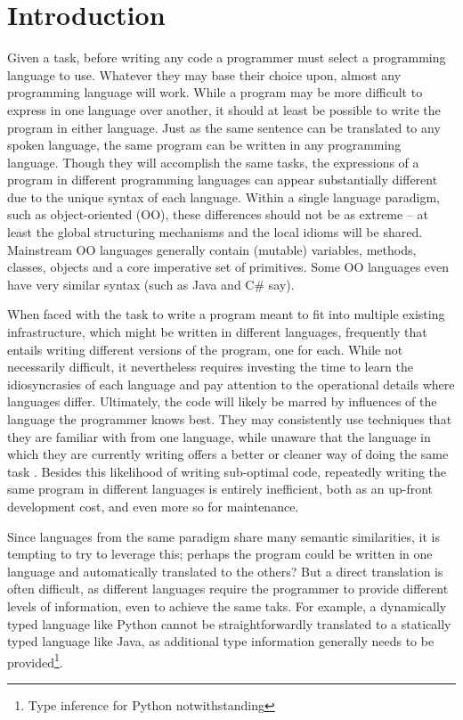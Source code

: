 \documentclass[sigplan,review,anonymous,prologue,dvipsnames]{acmart}
\begin{document}
\section{Introduction}

Given a task, before writing any code a programmer must select a programming 
language to use. Whatever they may base their choice upon, almost any
programming language will work. While a program may be more difficult to
express in one language over another, it should at least be possible to write
the program in either language. Just as the same sentence can be translated to
any spoken language, the same program can be written in any programming
language. Though they will accomplish the same tasks, the
expressions of a program in different programming languages can appear
substantially different due to the unique syntax of each language. Within a
single language paradigm, such as object-oriented (OO),
these differences should not be as extreme -- at least the global structuring
mechanisms and the local idioms will be shared.  Mainstream OO languages
generally contain (mutable) variables, methods, classes, objects and a core
imperative set of primitives. Some OO languages even have very similar syntax
(such as Java and C\# say).

When faced with the task to write a program meant to fit into multiple existing
infrastructure, which might be written in different languages, frequently that
entails writing different versions of the program, one for each. While not
necessarily difficult, it nevertheless
requires investing the time to learn the idiosyncrasies of each language and 
pay attention to the operational details where languages differ. Ultimately, 
the code will likely be marred by influences of the language the programmer 
knows best. They may consistently use techniques that they are familiar with 
from one language, while unaware that the language in which they are currently 
writing offers a better or cleaner way of doing the same task 
\cite{scholtz1990learning, alexandron2012effect}. Besides this 
likelihood of writing sub-optimal code, repeatedly writing the same program in 
different languages is entirely inefficient, both as an up-front development cost,
and even more so for maintenance.

Since languages from the same paradigm share many semantic similarities,
it is tempting to try to leverage this; perhaps the program could be written in
one language and
automatically translated to the others?  But a direct translation is often
difficult, as different languages require the programmer to provide different
levels of information, even to achieve the same taks.  For example, a dynamically
typed language like Python
cannot be straightforwardly translated to a statically typed 
language like Java, as additional type information generally needs to be 
provided\footnote{Type inference for Python notwithstanding}.
\end{document}
